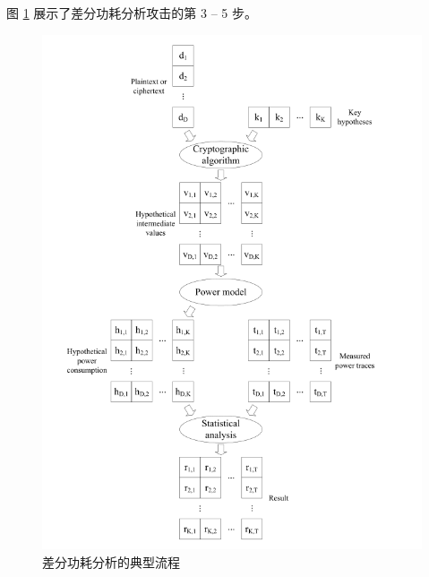 图 \ref{fig:dpa} 展示了差分功耗分析攻击的第 3 -- 5 步。

\begin{figure}[htbp]

    \centering
    \includegraphics[height=.8\textheight]{../images/dpa.png}
    \caption{差分功耗分析的典型流程\cite{paa_en}}
    \label{fig:dpa}
\end{figure}